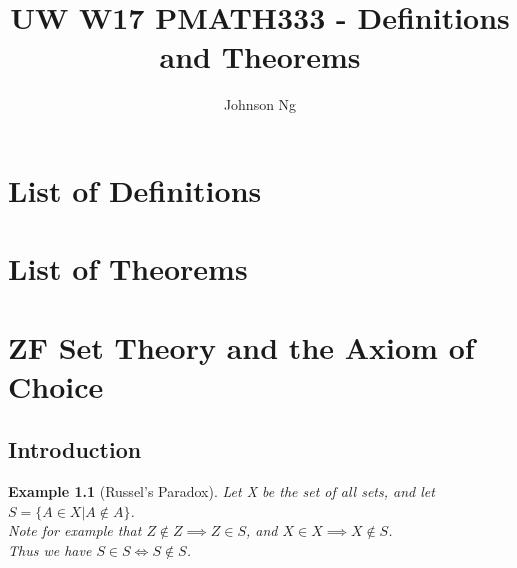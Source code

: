 \documentclass[11pt, oneside]{book}
\title{UW W17 PMATH333 - Definitions and Theorems}
\author{Johnson Ng}
\theoremstyle{break}
\newtheorem{eg}{Example}[section]
\begin{document}
\maketitle
\tableofcontents

\chapter*{List of Definitions}

\chapter*{List of Theorems}

\appendix

\chapter{ZF Set Theory and the Axiom of Choice}
\section{Introduction}
\begin{eg}[Russel's Paradox]\label{russel_paradox}
	Let X be the set of all sets, and let $S = \{ A \in X | A \notin A\}$.\\
	Note for example that $Z \notin Z \implies Z \in S$, and $X \in X \implies X \notin S$.\\
	Thus we have $S \in S \iff S \notin S$.
\end{eg}
\end{document}
